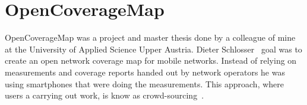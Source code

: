 \documentclass[master,english]{hgbthesis}
\begin{document}
\section{OpenCoverageMap}
OpenCoverageMap was a project and  master thesis done by a colleague of mine at the University of Applied Science Upper Austria. Dieter Schlosser~\cite{Schlosser2012} goal was to create an open network coverage map for mobile networks. Instead of relying on measurements and coverage reports handed out by network operators he was using smartphones that were doing the measurements. This approach, where users a carrying out work, is know as crowd-sourcing~\cite{Surowiecki2004}.
\end{document}

